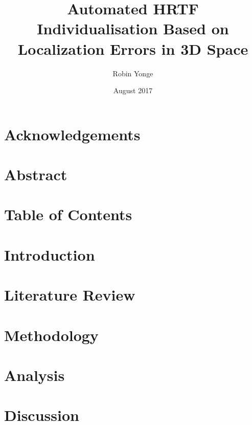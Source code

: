 \documentclass[12pt, letter, titlepage, draft]{report}
\begin{document}
\title{Automated HRTF Individualisation Based on Localization Errors in 3D Space}
\author{Robin Yonge}
\date{August 2017}
\maketitle

\section{Acknowledgements}

\section{Abstract}


\section{Table of Contents}

\section{Introduction}


\section{Literature Review}


\section{Methodology}


\section{Analysis}


\section{Discussion}





\end{document}
